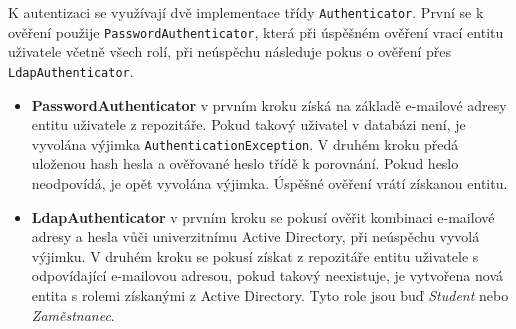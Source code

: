 K autentizaci se využívají dvě implementace třídy \texttt{Authenticator}. První se k ověření použije \texttt{PasswordAuthenticator}, která při úspěšném ověření vrací entitu uživatele včetně všech rolí, při neúspěchu následuje pokus o ověření přes \texttt{LdapAuthenticator}.

\begin{itemize}
	\item \textbf{PasswordAuthenticator} v prvním kroku získá na základě e-mailové adresy entitu uživatele z repozitáře. Pokud takový uživatel v databázi není, je vyvolána výjimka \texttt{AuthenticationException}. V druhém kroku předá uloženou hash hesla a ověřované heslo třídě  k porovnání. Pokud heslo neodpovídá, je opět vyvolána výjimka. Úspěšné ověření vrátí získanou entitu.
	\item \textbf{LdapAuthenticator} v prvním kroku se pokusí ověřit kombinaci e-mailové adresy a hesla vůči univerzitnímu Active Directory, při neúspěchu vyvolá výjimku. V druhém kroku se pokusí získat z repozitáře entitu uživatele s odpovídající e-mailovou adresou, pokud takový neexistuje, je vytvořena nová entita s rolemi získanými z Active Directory. Tyto role jsou buď \textit{Student} nebo \textit{Zaměstnanec}.
\end{itemize}

